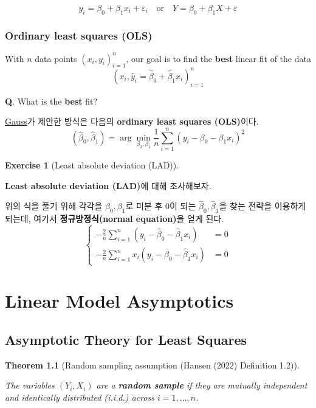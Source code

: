 \documentclass[
  letterpaper,
  DIV=11,
  numbers=noendperiod]{scrreprt}
\theoremstyle{definition}
\newtheorem{exercise}{Exercise}[chapter]
\theoremstyle{plain}
\newtheorem{theorem}{Theorem}[chapter]
\theoremstyle{remark}
\begin{document}
\[
y_i = \beta_0 + \beta_1 x_i + \varepsilon_i \quad{} \text{or}\quad{} Y=\beta_0 + \beta_1 X +\varepsilon
\]

\section{Ordinary least squares (OLS)}\label{ordinary-least-squares-ols}

With \(n\) data points \((x_i, y_i)_{i=1}^n\), our goal is to find the
\textbf{best} linear fit of the data \[
(x_i, \hat{y}_i = \hat{\beta}_0 + \hat{\beta}_1 x_i)_{i=1}^n
\]

\textbf{Q}. What is the \textbf{best} fit?

\href{https://en.wikipedia.org/wiki/Carl_Friedrich_Gauss}{Gauss}가
제안한 방식은 다음의 \textbf{ordinary least squares (OLS)}이다. \[
(\hat{\beta}_0, \hat{\beta}_1) = \arg\min_{\beta_0, \beta_1} \frac{1}{n}\sum_{i=1}^n (y_i - \beta_0 -\beta_1 x_i)^2
\]

\begin{exercise}[Least absolute deviation
(LAD)]\protect\hypertarget{exr-OLS01}{}\label{exr-OLS01}

\textbf{Least absolute deviation (LAD)}에 대해 조사해보자.

\end{exercise}

위의 식을 풀기 위해 각각을 \(\beta_0, \beta_1\)로 미분 후 \(0\)이 되는
\(\hat{\beta}_0, \hat{\beta}_1\)을 찾는 전략을 이용하게 되는데, 여기서
\textbf{정규방정식(normal equation)}을 얻게 된다. \[
\begin{cases}
-\frac{2}{n}\sum_{i=1}^n (y_i - \hat{\beta}_0 - \hat{\beta}_1 x_i) &=0\\
-\frac{2}{n}\sum_{i=1}^n x_i(y_i - \hat{\beta}_0 - \hat{\beta}_1 x_i) &=0
\end{cases}
\]

\part{Linear Model Asymptotics}

\chapter{Asymptotic Theory for Least
Squares}\label{asymptotic-theory-for-least-squares}

\begin{theorem}[Random sampling assumption (Hansen (2022) Definition
1.2)]\protect\hypertarget{thm-rss}{}\label{thm-rss}

The variables \((Y_i, X_i)\) are a \textbf{random sample} if they are
mutually independent and identically distributed (i.i.d.) across
\(i=1,\ldots, n\).

\end{theorem}
\end{document}
